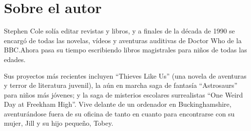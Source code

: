 \chapter*{Sobre el autor}

{Stephen Cole solía editar revistas y libros, y a finales de la década
 de 1990 se encargó de todas las novelas, vídeos y aventuras auditivas de
 Doctor Who de la BBC.\@ Ahora pasa su tiempo escribiendo libros
magistrales para niños de todas las edades.}

{Sus proyectos más recientes incluyen ``Thieves Like Us'' (una novela de
 aventuras y terror de literatura juvenil), la aún en marcha saga de
 fantasía ``Astrosaurs'' para niños más jóvenes; y la saga de misterios
 escolares surrealistas ``One Weird Day at Freekham High''. Vive delante
 de un ordenador en Buckinghamshire, aventurándose fuera de su oficina de
 tanto en cuanto para encontrarse con su mujer, Jill y su hijo pequeño,
Tobey.}
